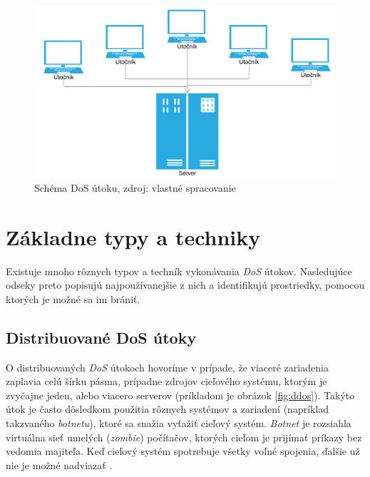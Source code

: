 \documentclass[
  digital, %
  oneside, %
  table,   %
  lof,     %
  nolot,   %
  nocover
]{fithesis3}
\begin{document}
\begin{figure}[h]
  \centering
    \includegraphics[width=\textwidth]{images/dos.png}
  \caption{Schéma DoS útoku, zdroj: vlastné spracovanie}
  \label{fig:dos}
\end{figure}

\section{Základne typy a techniky}
Existuje mnoho rôznych typov a techník vykonávania \textit{DoS} útokov.
Nasledujúce odseky preto popisujú najpoužívanejšie z nich a identifikujú
prostriedky, pomocou ktorých je možné sa im brániť.

\subsection{Distribuované DoS útoky}
O distribuovaných \textit{DoS} útokoch hovoríme v prípade, že viaceré zariadenia zaplavia
celú šírku pásma, prípadne zdrojov cieľového systému, ktorým je zvyčajne jeden, alebo viacero
serverov (príkladom je obrázok \ref{fig:ddos}). Takýto útok je často dôsledkom použitia rôznych systémov a zariadení (napríklad
takzvaného \textit{botnetu}), ktoré sa snažia vyťažiť cieľový systém. \textit{Botnet} je rozsiahla
virtuálna sieť umelých (\textit{zombie}) počítačov, ktorých cieľom je prijímať príkazy bez
vedomia majiteľa. Keď cieľový systém spotrebuje všetky voľné spojenia, ďalšie už nie
je možné nadviazať \cite{Zargar:2013:DDoS}. 
\end{document}
